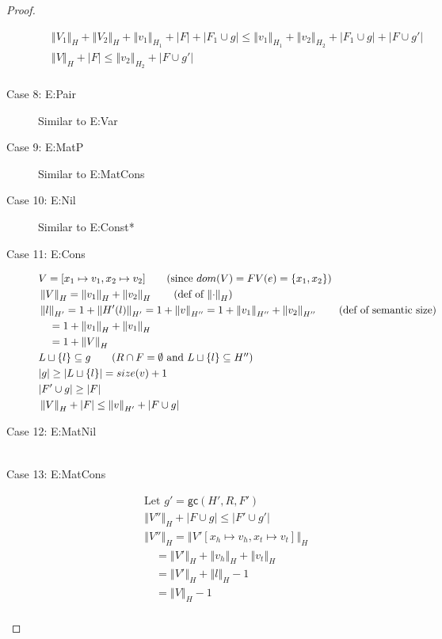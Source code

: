 \documentclass[11pt]{article}
\newcommand{\ssize}[2]{\left\Vert #2 \right\Vert_{#1}}
\newcommand{\gc}[3]{\mathsf{gc}(#1,#2,#3)}
\theoremstyle{definition}
\begin{document}
\begin{proof}
\begin{description}
\begin{align*}
  &\ssize{H}{V_1} + \ssize{H}{V_2} + \ssize{H_1}{v_1} + |F| + |F_1 \cup g| \le \ssize{H_1}{v_1} + \ssize{H_2}{v_2} +
  |F_1 \cup g| + |F \cup g'|\\
  &\ssize{H}{V} + |F| \le \ssize{H_2}{v_2} + |F \cup g'|\\
  \end{align*}
  \item[Case 8: E:Pair]
  Similar to E:Var
  \item[Case 9: E:MatP]
  Similar to E:MatCons
  \item[Case 10: E:Nil]
  Similar to E:Const*
  \item[Case 11: E:Cons]
  \begin{align*}
  &V = [x_1 \mapsto v_1,x_2 \mapsto v_2] \tag{since $dom(V) = FV(e) = \{x_1,x_2\}$}\\
  &\ssize{H}{V} = \ssize{H}{v_1} + \ssize{H}{v_2} \tag{def of $\ssize{H}{\cdot}$}\\
  &\ssize{H'}{l} = 1 + \ssize{H'}{H'(l)} = 1 + \ssize{H''}{v} = 1 + \ssize{H''}{v_1} + \ssize{H''}{v_2}
  \tag{def of semantic size}\\
  &\quad = 1 + \ssize{H}{v_1} + \ssize{H}{v_1}\\
  &\quad = 1 + \ssize{H}{V}\\
  &L \sqcup \{l\} \subseteq g \tag{$R \cap F = \emptyset$ and $L \sqcup \{l\} \subseteq H''$}\\
  &|g| \ge |L \sqcup \{l\}| = size(v) + 1\\
  &|F' \cup g| \ge |F|\\
  &\ssize{H}{V} + |F| \le \ssize{H'}{v} + |F \cup g|\\
  \end{align*}
  \item[Case 12: E:MatNil]
  \begin{align*}
  \end{align*}
  \item [Case 13: E:MatCons]
  \begin{align*}
  &\text{Let } g' = \gc{H'}{R}{F'}\\
  &\ssize{H}{V''}  + |F \cup g| \le |F' \cup g'| \tag{IH (wfc from main lemma)}\\
  &\ssize{H}{V''} = \ssize{H}{V'[x_h \mapsto v_h, x_t \mapsto v_t]}\\
  &\quad = \ssize{H}{V'} + \ssize{H}{v_h} + \ssize{H}{v_t}\\
  &\quad = \ssize{H}{V'} + \ssize{H}{l} - 1\\
  &\quad = \ssize{H}{V} - 1\\

\end{align*}
\end{description}
\end{proof}
\end{document}
